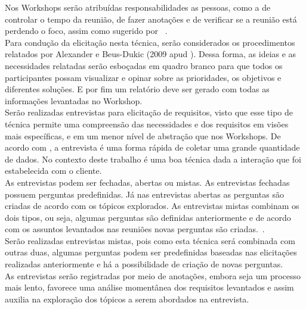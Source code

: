 Nos Workshops serão atribuídas responsabilidades as pessoas, como a de controlar o tempo da reunião, de fazer anotações e de verificar se a reunião está perdendo o foco, assim como sugerido por ~\cite{falbo}. \\

Para condução da elicitação nesta técnica, serão considerados os procedimentos relatados por Alexander e Beus-Dukic (2009 apud  ). Dessa forma, as ideias e as necessidades relatadas serão esboçadas em quadro branco para que todos os participantes possam visualizar e opinar sobre as prioridades, os objetivos e diferentes soluções. E por fim um relatório deve ser gerado com todas as informações levantadas no Workshop.\\

Serão realizadas entrevistas para elicitação de requisitos, visto que esse tipo de técnica permite uma compreensão das necessidades e dos requisitos em visões mais específicas, e em um menor nível de abstração que nos Workshops. 
De acordo com , a entrevista é uma forma rápida de coletar uma grande quantidade de dados. No contexto deste trabalho é uma boa técnica dada a interação que foi estabelecida com o cliente.\\

As entrevistas podem ser fechadas, abertas ou mistas. As entrevistas fechadas possuem perguntas predefinidas. Já nas entrevistas abertas as perguntas são criadas de acordo com os tópicos explorados. As entrevistas mistas combinam os dois tipos, ou seja, algumas perguntas são definidas anteriormente e de acordo com os assuntos levantados nas reuniões novas perguntas são criadas.~\cite{sommerville}.\\

Serão realizadas entrevistas mistas, pois como esta técnica será combinada com outras duas, algumas perguntas podem ser predefinidas baseadas nas elicitações realizadas anteriormente e há a possibilidade de criação de novas perguntas.\\

As entrevistas serão registradas por meio de anotações, embora seja um processo mais lento, favorece uma análise momentânea dos requisitos levantados e assim auxilia na exploração dos tópicos a serem abordados na entrevista.\\

